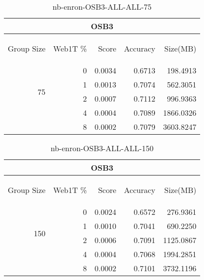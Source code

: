 \begin{center}
\begin{table}[htbp]
\begin{tabular}{ | r | r | r | r | r |}
\hline
\multicolumn{5}{|c|}{OSB3}\\
\hline
\begin{sideways}Group Size\end{sideways} & \begin{sideways}Web1T \%\end{sideways} & \begin{sideways}Score\end{sideways} & \begin{sideways}Accuracy\end{sideways} & \begin{sideways}Size(MB)\end{sideways}\\
\hline
\multirow{4}{*}{75}
 & 0 & 0.0034 & 0.6713 & 198.4913\\ \cline{2-5}
 & 1 & 0.0013 & 0.7074 & 562.3051\\ \cline{2-5}
 & 2 & 0.0007 & 0.7112 & 996.9363\\ \cline{2-5}
 & 4 & 0.0004 & 0.7089 & 1866.0326\\ \cline{2-5}
 & 8 & 0.0002 & 0.7079 & 3603.8247\\ \cline{2-5}
\hline
\end{tabular}
\caption{nb-enron-OSB3-ALL-ALL-75}
\label{table:nb-enron-OSB3-ALL-ALL-75}
\end{table}
\end{center}

\begin{center}
\begin{table}[htbp]
\begin{tabular}{ | r | r | r | r | r |}
\hline
\multicolumn{5}{|c|}{OSB3}\\
\hline
\begin{sideways}Group Size\end{sideways} & \begin{sideways}Web1T \%\end{sideways} & \begin{sideways}Score\end{sideways} & \begin{sideways}Accuracy\end{sideways} & \begin{sideways}Size(MB)\end{sideways}\\
\hline
\multirow{4}{*}{150}
 & 0 & 0.0024 & 0.6572 & 276.9361\\ \cline{2-5}
 & 1 & 0.0010 & 0.7041 & 690.2250\\ \cline{2-5}
 & 2 & 0.0006 & 0.7091 & 1125.0867\\ \cline{2-5}
 & 4 & 0.0004 & 0.7068 & 1994.2851\\ \cline{2-5}
 & 8 & 0.0002 & 0.7101 & 3732.1196\\ \cline{2-5}
\hline
\end{tabular}
\caption{nb-enron-OSB3-ALL-ALL-150}
\label{table:nb-enron-OSB3-ALL-ALL-150}
\end{table}
\end{center}

